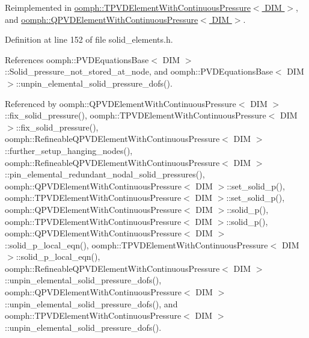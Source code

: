 Reimplemented in \hyperlink{classoomph_1_1TPVDElementWithContinuousPressure_aa39375a80e84e370d1633122e87ad86d}{oomph\+::\+T\+P\+V\+D\+Element\+With\+Continuous\+Pressure$<$ D\+I\+M $>$}, and \hyperlink{classoomph_1_1QPVDElementWithContinuousPressure_aa21b5dbde38a2cfc7fa7786052267b50}{oomph\+::\+Q\+P\+V\+D\+Element\+With\+Continuous\+Pressure$<$ D\+I\+M $>$}.



Definition at line 152 of file solid\+\_\+elements.\+h.



References oomph\+::\+P\+V\+D\+Equations\+Base$<$ D\+I\+M $>$\+::\+Solid\+\_\+pressure\+\_\+not\+\_\+stored\+\_\+at\+\_\+node, and oomph\+::\+P\+V\+D\+Equations\+Base$<$ D\+I\+M $>$\+::unpin\+\_\+elemental\+\_\+solid\+\_\+pressure\+\_\+dofs().



Referenced by oomph\+::\+Q\+P\+V\+D\+Element\+With\+Continuous\+Pressure$<$ D\+I\+M $>$\+::fix\+\_\+solid\+\_\+pressure(), oomph\+::\+T\+P\+V\+D\+Element\+With\+Continuous\+Pressure$<$ D\+I\+M $>$\+::fix\+\_\+solid\+\_\+pressure(), oomph\+::\+Refineable\+Q\+P\+V\+D\+Element\+With\+Continuous\+Pressure$<$ D\+I\+M $>$\+::further\+\_\+setup\+\_\+hanging\+\_\+nodes(), oomph\+::\+Refineable\+Q\+P\+V\+D\+Element\+With\+Continuous\+Pressure$<$ D\+I\+M $>$\+::pin\+\_\+elemental\+\_\+redundant\+\_\+nodal\+\_\+solid\+\_\+pressures(), oomph\+::\+Q\+P\+V\+D\+Element\+With\+Continuous\+Pressure$<$ D\+I\+M $>$\+::set\+\_\+solid\+\_\+p(), oomph\+::\+T\+P\+V\+D\+Element\+With\+Continuous\+Pressure$<$ D\+I\+M $>$\+::set\+\_\+solid\+\_\+p(), oomph\+::\+Q\+P\+V\+D\+Element\+With\+Continuous\+Pressure$<$ D\+I\+M $>$\+::solid\+\_\+p(), oomph\+::\+T\+P\+V\+D\+Element\+With\+Continuous\+Pressure$<$ D\+I\+M $>$\+::solid\+\_\+p(), oomph\+::\+Q\+P\+V\+D\+Element\+With\+Continuous\+Pressure$<$ D\+I\+M $>$\+::solid\+\_\+p\+\_\+local\+\_\+eqn(), oomph\+::\+T\+P\+V\+D\+Element\+With\+Continuous\+Pressure$<$ D\+I\+M $>$\+::solid\+\_\+p\+\_\+local\+\_\+eqn(), oomph\+::\+Refineable\+Q\+P\+V\+D\+Element\+With\+Continuous\+Pressure$<$ D\+I\+M $>$\+::unpin\+\_\+elemental\+\_\+solid\+\_\+pressure\+\_\+dofs(), oomph\+::\+Q\+P\+V\+D\+Element\+With\+Continuous\+Pressure$<$ D\+I\+M $>$\+::unpin\+\_\+elemental\+\_\+solid\+\_\+pressure\+\_\+dofs(), and oomph\+::\+T\+P\+V\+D\+Element\+With\+Continuous\+Pressure$<$ D\+I\+M $>$\+::unpin\+\_\+elemental\+\_\+solid\+\_\+pressure\+\_\+dofs().

\mbox{\label{classoomph_1_1PVDEquationsBase_a7894dec52664b0c326b3af50dc7cd6f5}} 
